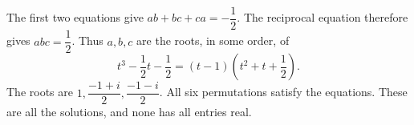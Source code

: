 The first two equations give $ab+bc+ca=-\dfrac{1}{2}$. The reciprocal equation therefore gives $abc=\dfrac{1}{2}$. Thus $a,b,c$ are the roots, in some order, of
\[t^3-\dfrac{1}{2}t-\dfrac{1}{2}=(t-1)\left(t^2+t+\dfrac{1}{2}\right).\]
The roots are $1,\dfrac{-1+i}{2},\dfrac{-1-i}{2}$. All six permutations satisfy the equations. These are all the solutions, and none has all entries real.
